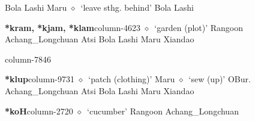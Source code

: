          Bola 
\hspace{1ex}
         Lashi 
\hspace{1ex}
         Maru 
\hspace{1ex}
         $\diamond$~`leave sthg. behind'
         Bola 
\hspace{1ex}
         Lashi 
  \item {\footnotesize \textbf{*kram, *kjam, *klam}}{\tiny column-4623}
         $\diamond$~`garden (plot)'
         Rangoon 
\hspace{1ex}
         Achang\_Longchuan 
\hspace{1ex}
         Atsi 
\hspace{1ex}
         Bola 
\hspace{1ex}
         Lashi 
\hspace{1ex}
         Maru 
\hspace{1ex}
         Xiandao 
  \item {\footnotesize \textbf{}}{\tiny column-7846}
  \item {\footnotesize \textbf{*klup}}{\tiny column-9731}
         $\diamond$~`patch (clothing)'
         Maru 
\hspace{1ex}
         $\diamond$~`sew (up)'
         OBur. 
\hspace{1ex}
         Achang\_Longchuan 
\hspace{1ex}
         Atsi 
\hspace{1ex}
         Bola 
\hspace{1ex}
         Lashi 
\hspace{1ex}
         Maru 
\hspace{1ex}
         Xiandao 
  \item {\footnotesize \textbf{*koH}}{\tiny column-2720}
         $\diamond$~`cucumber'
         Rangoon 
\hspace{1ex}
         Achang\_Longchuan 
